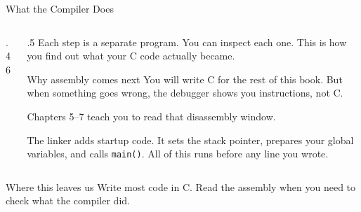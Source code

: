 \documentclass[9pt,aspectratio=169,xcolor=table]{beamer}
\begin{document}
\begin{frame}{What the Compiler Does}
    \begin{columns}[c]
    \begin{column}{.46\textwidth}
        \begin{center}
        \end{center}
    \end{column}
    \begin{column}{.5\textwidth}
        Each step is a separate program. You can inspect each one. This
        is how you find out what your C code actually became.

        \vspace{1mm}
        \begin{block}{Why assembly comes next}
            You will write C for the rest of this book. But when
            something goes wrong, the debugger shows you
            \alert{instructions}, not C.

            \vspace{2mm}
            Chapters 5--7 teach you to read that disassembly window.
        \end{block}

        \vspace{1mm}
        {\small The linker adds \alert{startup code}. It sets the
        stack pointer, prepares your global variables, and calls
        \texttt{main()}. All of this runs before any line you wrote.}
    \end{column}
    \end{columns}

    \vspace{0mm}
    \begin{block}{Where this leaves us}
        Write most code in C. Read the assembly when you need to check what the compiler did.
    \end{block}
\end{frame}
\end{document}
